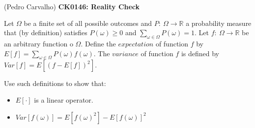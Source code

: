 \documentclass[11pt]{article}
\newenvironment{EX}[2][Exercise]{\begin{trivlist}
\item[{\color{red} \hskip \labelsep {\bfseries #1}\hskip \labelsep {\bfseries #2.}}]}{\end{trivlist}}
\begin{document}

 (Pedro Carvalho) \hfill {\Large \bfseries CK0146: Reality Check} \\

\begin{EX}{R.1}
 Let $\Omega$ be a finite set of all possible outcomes and $P:\ \Omega \rightarrow \mathbb{R}$ a probability measure that (by definition) satisfies $P(\omega) \geq 0$ and $\sum\limits_{\omega \in \Omega} P(\omega) = 1$. Let $f:\ \Omega \rightarrow \mathbb{R}$ be an arbitrary function o $\Omega$. Define the $expectation$ of function $f$ by $E[f] = \sum\limits_{\omega \in \Omega} P(\omega)f(\omega)$. The $variance$ of function $f$ is defined by $Var[f] = E[(f - E[f])^2]$.
 
 Use such definitions to show that:
 \begin{itemize}
  \item $E[\cdot]$ is a linear operator.
  \item $Var[f(\omega)] = E[f(\omega)^2] - E[f(\omega)]^2$
 \end{itemize}
\end{EX}
\end{document}

